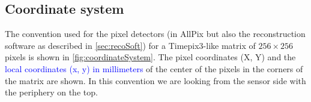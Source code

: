 \subsection{Coordinate system}

The convention used for the pixel detectors (in AllPix but also the
reconstruction software as described in \cref{sec:recoSoft}) for a
Timepix3-like matrix of $256\times256$ pixels is shown in
\cref{fig:coordinateSystem}. The pixel coordinates (X, Y) and the
\textcolor{blue}{local coordinates (x, y) in millimeters} of the
center of the pixels in the corners of the matrix are shown. In this
convention we are looking from the sensor side with the periphery on
the top.

\begin{figure}[htbp]
  \centering
\end{figure}
